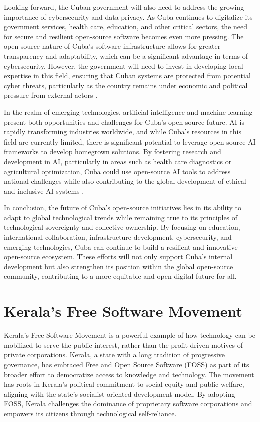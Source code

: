 \begin{refsection}
Looking forward, the Cuban government will also need to address the growing importance of cybersecurity and data privacy. As Cuba continues to digitalize its government services, health care, education, and other critical sectors, the need for secure and resilient open-source software becomes even more pressing. The open-source nature of Cuba’s software infrastructure allows for greater transparency and adaptability, which can be a significant advantage in terms of cybersecurity. However, the government will need to invest in developing local expertise in this field, ensuring that Cuban systems are protected from potential cyber threats, particularly as the country remains under economic and political pressure from external actors \cite[pp.~112-134]{kapcia}.

In the realm of emerging technologies, artificial intelligence and machine learning present both opportunities and challenges for Cuba’s open-source future. AI is rapidly transforming industries worldwide, and while Cuba’s resources in this field are currently limited, there is significant potential to leverage open-source AI frameworks to develop homegrown solutions. By fostering research and development in AI, particularly in areas such as health care diagnostics or agricultural optimization, Cuba could use open-source AI tools to address national challenges while also contributing to the global development of ethical and inclusive AI systems \cite[pp.~56-87]{feinberg}.

In conclusion, the future of Cuba’s open-source initiatives lies in its ability to adapt to global technological trends while remaining true to its principles of technological sovereignty and collective ownership. By focusing on education, international collaboration, infrastructure development, cybersecurity, and emerging technologies, Cuba can continue to build a resilient and innovative open-source ecosystem. These efforts will not only support Cuba’s internal development but also strengthen its position within the global open-source community, contributing to a more equitable and open digital future for all.

\section{Kerala's Free Software Movement}

Kerala's Free Software Movement is a powerful example of how technology can be mobilized to serve the public interest, rather than the profit-driven motives of private corporations. Kerala, a state with a long tradition of progressive governance, has embraced Free and Open Source Software (FOSS) as part of its broader effort to democratize access to knowledge and technology. The movement has roots in Kerala's political commitment to social equity and public welfare, aligning with the state's socialist-oriented development model. By adopting FOSS, Kerala challenges the dominance of proprietary software corporations and empowers its citizens through technological self-reliance.


\end{refsection}
